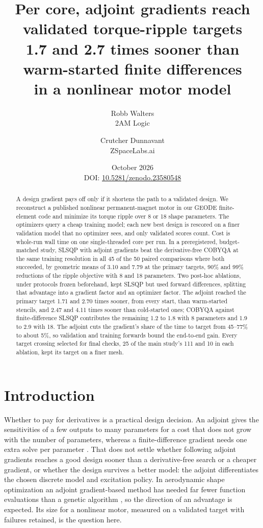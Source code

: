 \documentclass{anvil-paper}
\title{Per core, adjoint gradients reach validated torque-ripple targets\\
1.7 and 2.7 times sooner than warm-started finite differences\\in a nonlinear motor model}
\author{Robb Walters\\
  {\normalsize 2AM Logic}
  \and Crutcher Dunnavant\\
  {\normalsize ZSpaceLabs.ai}}
\date{October 2026\\[0.5ex]
  {\normalsize DOI: \href{https://doi.org/10.5281/zenodo.23580548}{10.5281/zenodo.23580548}}}
\begin{document}
\maketitle
\begin{abstract}
A design gradient pays off only if it shortens the path to a validated
design. We reconstruct a published nonlinear
permanent-magnet motor in our GEODE finite-element code and minimize its
torque ripple over 8 or 18 shape parameters. The optimizers query a cheap
training model; each new best design is rescored on a finer validation
model that no optimizer sees, and only validated scores count. Cost is
whole-run wall time on one single-threaded core per run. In a
preregistered, budget-matched study, SLSQP with adjoint gradients beat the
derivative-free COBYQA at the same training resolution in all 45 of the 50
paired comparisons where both succeeded, by geometric means of 3.10 and
7.79 at the primary targets, 90\% and 99\% reductions of the ripple
objective with 8 and 18 parameters. Two post-hoc ablations, under
protocols frozen beforehand, kept SLSQP but used forward differences,
splitting that advantage into a gradient factor and an optimizer factor.
The adjoint reached the primary target 1.71 and 2.70 times sooner, from
every start, than warm-started stencils, and 2.47 and 4.11 times sooner
than cold-started ones; COBYQA against
finite-difference SLSQP contributes the remaining 1.2 to 1.8 with 8
parameters and 1.9 to 2.9 with 18. The adjoint cuts the gradient's share
of the time to target from 45--77\% to about 5\%, so validation and
training forwards bound the end-to-end gain. Every target crossing
selected for final checks, 25 of the main study's 111 and 10 in each
ablation, kept its target on a finer mesh.
\end{abstract}

\section{Introduction}
Whether to pay for derivatives is a practical design decision. An adjoint
gives the sensitivities of a few outputs to many parameters for a cost
that does not grow with the number of parameters, whereas a
finite-difference gradient needs one extra solve per parameter
\citep{giles2000introduction,martins2013review}. That does not settle
whether following adjoint gradients reaches a good design sooner than a
derivative-free search or a cheaper gradient, or whether the design
survives a better model: the adjoint differentiates the chosen discrete
model and excitation policy. In aerodynamic shape optimization an adjoint
gradient-based method has needed far fewer function evaluations than a
genetic algorithm \citep{zingg2008comparative}, so the direction of an
advantage is expected. Its size for a nonlinear motor, measured on a
validated target with failures retained, is the question here.
\end{document}
